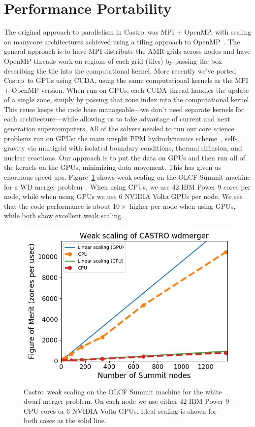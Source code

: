 \documentclass[a4paper]{jpconf}
\newcommand{\castro}{{\sffamily Castro}}
\begin{document}
\section{Performance Portability}

The original approach to parallelism in \castro\ was MPI + OpenMP,
with scaling on manycore architectures achieved using a tiling approach
to OpenMP~\cite{tiling,astronum:2017}.  The general approach is to
have MPI distribute the AMR grids across nodes and have OpenMP threads
work on regions of each grid (tiles) by passing the box describing the
tile into the computational kernel.  More recently we've ported
\castro\ to GPUs using CUDA, using the same computational kernels as
the MPI + OpenMP version.  When run on GPUs, each CUDA thread handles
the update of a single zone, simply by passing that zone index into
the computational kernel.  This reuse keeps the code base
manageable---we don't need separate kernels for each
architecture---while allowing us to take advantage of current and next
generation supercomputers.  All of the solvers needed to run our core
science problems run on GPUs: the main unsplit PPM hydrodynamics
scheme~\cite{ppm,millercolella:2002}, self-gravity via multigrid with
isolated boundary conditions, thermal diffusion, and nuclear
reactions.  Our approach is to put the data on GPUs and then run all
of the kernels on the GPUs, minimizing data movement.  This has given
us enormous speed-ups.  Figure~\ref{fig:gpu} shows weak scaling on the
OLCF Summit machine for a WD merger problem~\cite{wdmergerI}.  When
using CPUs, we use 42 IBM Power 9 cores per node, while when using
GPUs we use 6 NVIDIA Volta GPUs per node.  We see that the code
performance is about $10\times$ higher per node when using GPUs, while
both show excellent weak scaling.

\begin{figure}[t]
\centering
\includegraphics[width=0.8\linewidth]{wdmerger_gpu}
\caption{\label{fig:gpu} \castro\ weak scaling on the OLCF Summit
  machine for the white dwarf merger problem.  On each node we use
  either 42 IBM Power 9 CPU cores or 6 NVIDIA Volta GPUs.  Ideal
  scaling is shown for both cases as the solid line.}
\end{figure}
\end{document}
